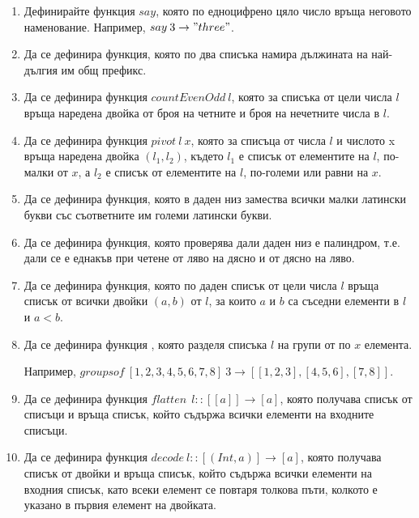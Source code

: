 \begin{enumerate}[resume]

	\item Дефинирайте функция $say$, която по едноцифрено цяло число връща неговото наменование. Например, $say \: 3 \rightarrow "three"$.

	\item Да се дефинира функция, която по два списъка намира дължината на най-дългия им общ префикс.

	\item Да се дефинира функция $countEvenOdd \: l$, която за списъка от цели числа $l$ връща наредена двойка от броя на четните и броя на нечетните числа в $l$.

	\item Да се дефинира функция $pivot \: l \: x$, която за списъца от числа $l$ и числото x връща наредена двойка $(l_1,l_2)$, където $l_1$ е списък от елементите на $l$, по-малки от $x$, а $l_2$ е списък от елементите на $l$, по-големи или равни на $x$.
	
	\item Да се дефинира функция, която в даден низ замества всички малки латински букви със съответните им големи латински букви.
	
	\item Да се дефинира функция, която проверява дали даден низ е палиндром, т.е. дали се е еднакъв при четене от ляво на дясно и от дясно на ляво.
	
	\item Да се дефинира функция, която по даден списък от цели числа $l$ връща списък от всички двойки $(a,b)$ от $l$, за които $a$ и $b$ са съседни елементи в $l$ и $a < b$.
	
	\item Да се дефинира функция , която разделя списъка $l$ на групи от по $x$ елемента. 
	
	Например, $groupsof \: [1,2,3,4,5,6,7,8] \: 3 \rightarrow [[1,2,3],[4,5,6],[7,8]]$.

	\item Да се дефинира функция $flatten \: \: l :: [[a]] \rightarrow [a]$, която получава списък от списъци и връща списък, който съдържа всички елементи на входните списъци.

	\item Да се дефинира функция $decode \: l :: [(Int,a)] \rightarrow [a]$, която получава списък от двойки и връща списък, който съдържа всички елементи на входния списък, като всеки елемент се повтаря толкова пъти, колкото е указано в първия елемент на двойката.


\end{enumerate}
